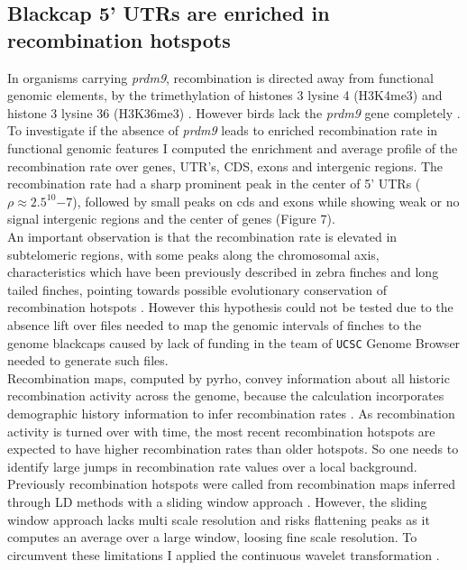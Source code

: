 \documentclass[12pt,a4paper]{article}
\begin{document}
\subsection{Blackcap 5' UTRs are enriched in recombination hotspots}
In organisms carrying \textit{prdm9}, recombination is directed away from functional genomic
elements, by the trimethylation of histones 3 lysine 4 (H3K4me3) and histone 3 lysine 36 (H3K36me3)
\parencite{cavassim_prdm9_2022, parvanov_prdm9_2017, lange_landscape_2016, baker_prdm9_2015, berg_prdm9_2010}.
However birds lack the \textit{prdm9} gene completely \parencite{cavassim_prdm9_2022}.
To investigate if the absence of \textit{prdm9} leads to enriched recombination rate in functional
genomic features I computed the enrichment and average profile of the recombination rate over genes,
UTR's, CDS, exons and intergenic regions. The recombination rate had a sharp prominent peak in the
center of 5' UTRs ($\rho \approx 2.5^10{-7}$), followed by small peaks on cds and exons while
showing weak or no signal intergenic regions and the center of genes (Figure 7).\\
An important observation is that the recombination rate is elevated in subtelomeric regions, with some peaks
along the chromosomal axis, characteristics which have been previously described in zebra finches
and long tailed finches, pointing towards possible evolutionary conservation of recombination
hotspots \parencite{singhal_2015}. However this hypothesis could not be tested due to the absence
lift over files needed to map the genomic intervals of finches to the genome blackcaps caused by
lack of funding in the team of \texttt{UCSC} Genome Browser needed to generate such files. \\

Recombination maps, computed by pyrho, convey information about all historic recombination
activity across the genome, because the calculation incorporates demographic history information to infer recombination
rates \parencite{doi:10.1126/sciadv.aaw9206}. As recombination activity is turned over with time,
the most recent recombination hotspots are expected to have higher recombination rates than older
hotspots\parencite{UbedaWilkins2011}. So one needs to identify large jumps in recombination rate
values over a local background. Previously recombination hotspots were called from
recombination maps inferred through LD methods with a sliding window approach \parencite{wooldridge_rapid_2023}.
However, the sliding window approach lacks multi scale resolution and risks flattening peaks as it
computes an average over a large window, loosing fine scale resolution. To circumvent these
limitations I applied the continuous wavelet transformation \parencite{Mexican-hat-wavelet}. \\
\end{document}
